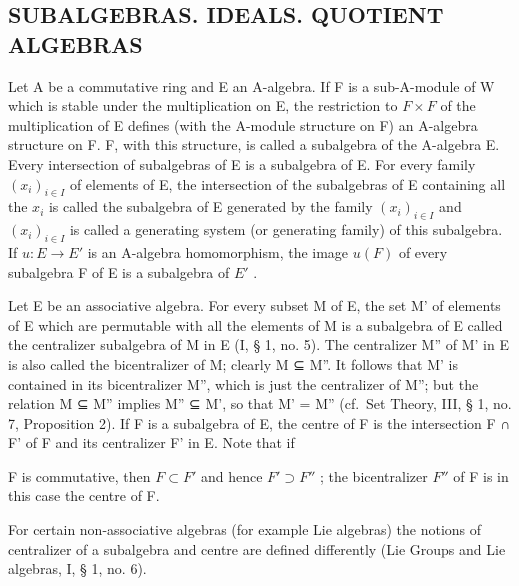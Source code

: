 \subsection{SUBALGEBRAS. IDEALS. QUOTIENT ALGEBRAS}

Let A be a commutative ring and E an A-algebra. If F is a sub-A-module of W which is stable under the multiplication on E, the restriction to \(F \times F\) of the multiplication of E defines (with the A-module structure on F) an A-algebra structure on F. F, with this structure, is called a subalgebra of the A-algebra E. Every intersection of subalgebras of E is a subalgebra of E. For every family \((x_{i})_{i \in I}\) of elements of E, the intersection of the subalgebras of E containing all the \(x_{i}\) is called the subalgebra of E generated by the family \((x_{i})_{i \in I}\) and \((x_{i})_{i \in I}\) is called a generating system (or generating family) of this subalgebra. If \(u: E \to E'\) is an A-algebra homomorphism, the image \(u(F)\) of every subalgebra F of E is a subalgebra of \(E'\) .

Let E be an associative algebra. For every subset M of E, the set M' of elements of E which are permutable with all the elements of M is a subalgebra of E called the centralizer subalgebra of M in E (I, § 1, no. 5). The centralizer M'' of M' in E is also called the bicentralizer of M; clearly M ⊆ M''. It follows that M' is contained in its bicentralizer M'', which is just the centralizer of M''; but the relation M ⊆ M'' implies M'' ⊆ M', so that M' = M'' (cf.~Set Theory, III, § 1, no. 7, Proposition 2). If F is a subalgebra of E, the centre of F is the intersection F ∩ F' of F and its centralizer F' in E. Note that if

F is commutative, then \(F \subset F'\) and hence \(F' \supset F''\) ; the bicentralizer \(F''\) of F is in this case the centre of F.

For certain non-associative algebras (for example Lie algebras) the notions of centralizer of a subalgebra and centre are defined differently (Lie Groups and Lie algebras, I, § 1, no. 6).

